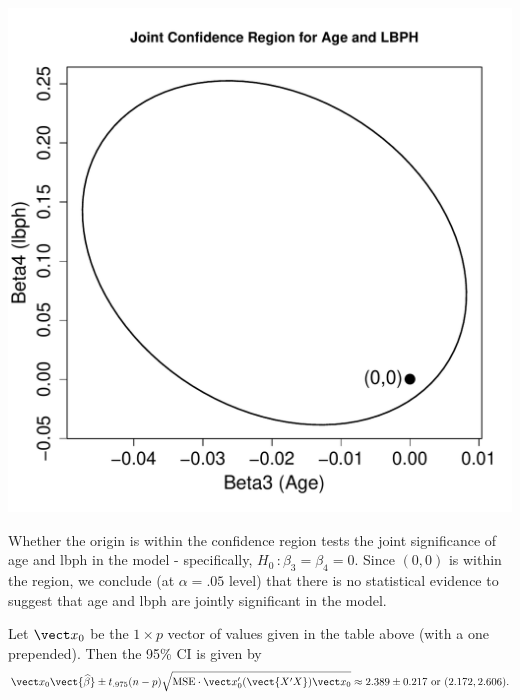 \documentclass{homework}
\begin{document}
\begin{minipage}{.5\textwidth}
  \includegraphics[width=\textwidth]{conf_region_1b.pdf}
\end{minipage}
\begin{minipage}{.5\textwidth}
  Whether the origin is within the confidence region tests the joint significance of age and lbph in the model - specifically, $H_0\,:\beta_3 = \beta_4 = 0$.  Since $(0,0)$ is within the region, we conclude (at $\alpha=.05$ level) that there is no statistical evidence to suggest that age and lbph are jointly significant in the model.
\end{minipage}


Let $\vect x_0$ be the $1\times p$ vector of values given in the table above (with a one prepended). Then the 95\% CI is given by 
$$
  \vect x_0 \vect{\hat \beta} \pm t_{.975}(n-p)\sqrt{\MSE\cdot\vect x_0'(\vect{X'X})\vect x_0} \approx 2.389\pm 0.217
\text{ or }
( 2.172, 2.606 ). $$
\end{document}
